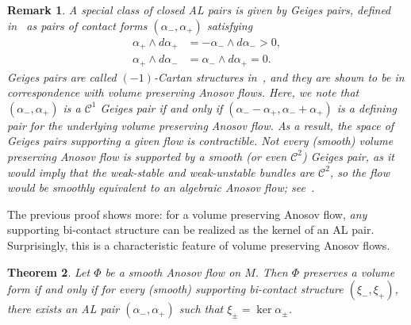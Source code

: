 \documentclass[letterpaper, 11pt]{article}
\numberwithin{equation}{section}
\newtheorem{thm}{Theorem}[section]
\newtheorem{rem}[thm]{Remark}
\begin{document}
\begin{rem} A special class of closed AL pairs is given by Geiges pairs, defined in~\cite[Section 8.5]{MNW} as pairs of contact forms $(\alpha_-, \alpha_+)$ satisfying 
\begin{align*}
\alpha_+ \wedge d\alpha_+ &= - \alpha_- \wedge d \alpha_- > 0, \\
\alpha_+ \wedge d\alpha_- &= \alpha_- \wedge d\alpha_+ = 0.
\end{align*}
Geiges pairs are called $(-1)$-Cartan structures in~\cite{H22b}, and they are shown to be in correspondence with volume preserving Anosov flows. Here, we note that $(\alpha_-, \alpha_+)$ is a $\mathcal{C}^1$ Geiges pair if and only if $(\alpha_- - \alpha_+, \alpha_- + \alpha_+)$ is a defining pair for the underlying volume preserving Anosov flow. As a result, the space of Geiges pairs supporting a given flow is contractible. Not every (smooth) volume preserving Anosov flow is supported by a smooth (or even $\mathcal{C}^2$) Geiges pair, as it would imply that the weak-stable and weak-unstable bundles are $\mathcal{C}^2$, so the flow would be smoothly equivalent to an algebraic Anosov flow; see~\cite[Th\'eor\`eme A]{G92}.
\end{rem}

The previous proof shows more: for a volume preserving Anosov flow, \emph{any} supporting bi-contact structure can be realized as the kernel of an AL pair. Surprisingly, this is a characteristic feature of volume preserving Anosov flows.

\begin{thm} \label{thm:supporting}
Let $\Phi$ be a smooth Anosov flow on $M$. Then $\Phi$ preserves a volume form if and only if for every (smooth) supporting bi-contact structure $(\xi_-, \xi_+)$, there exists an AL pair $(\alpha_-, \alpha_+)$ such that $\xi_\pm = \ker \alpha_\pm$.
\end{thm}
\end{document}
